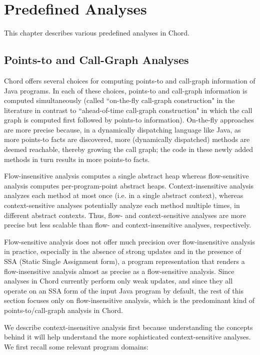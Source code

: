 \chapter{Predefined Analyses}
\label{chap:predefined}

This chapter describes various predefined analyses in Chord.

\section{Points-to and Call-Graph Analyses}

Chord offers several choices for computing points-to and call-graph information of Java programs.
In each of these choices, points-to and call-graph information is computed simultaneously
(called ``on-the-fly call-graph construction" in the literature in contrast to ``ahead-of-time call-graph
construction" in which the call graph is computed first followed by points-to information).
On-the-fly approaches are more precise because, in a dynamically dispatching language like Java,
as more points-to facts are discovered, more (dynamically dispatched) methods are deemed reachable,
thereby growing the call graph; the code in these newly added methods in turn results in more
points-to facts.

Flow-insensitive analysis computes a single abstract heap whereas flow-sensitive analysis computes
per-program-point abstract heaps.  Context-insensitive analysis analyzes each method at most once (i.e. in a single abstract context),
whereas context-sensitive analyses potentially analyze each method multiple times, in different abstract contexts.
Thus, flow- and context-sensitive analyses are more precise but less scalable than flow- and context-insensitive
analyses, respectively.

Flow-sensitive analysis does not offer much precision over flow-insensitive analysis in
practice, especially in the absence of strong updates and in the presence of SSA (Static Single Assignment form),
a program representation that renders a flow-insensitive analysis almost as precise as a flow-sensitive analysis.
Since analyses in Chord currently perform only weak updates, and since they all operate on an SSA form of the
input Java program by default, the rest of this section focuses only on flow-insensitive analysis, which is the predominant
kind of points-to/call-graph analysis in Chord.

We describe context-insensitive analysis first because understanding the concepts behind it will help understand
the more sophisticated context-sensitive analyses.
We first recall some relevant program domains:

